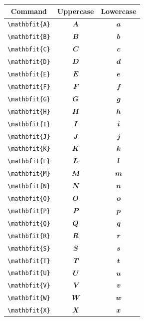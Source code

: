 \documentclass[12pt,a4paper]{article}
\begin{document}
\begin{longtable}{|c|c|c|}
\hline
\textbf{Command} & \textbf{Uppercase} & \textbf{Lowercase} \\
\hline
\verb|\mathbfit{A}| & $\mathbfit{A}$ & $\mathbfit{a}$ \\ %
\verb|\mathbfit{B}| & $\mathbfit{B}$ & $\mathbfit{b}$ \\ %
\verb|\mathbfit{C}| & $\mathbfit{C}$ & $\mathbfit{c}$ \\ %
\verb|\mathbfit{D}| & $\mathbfit{D}$ & $\mathbfit{d}$ \\ %
\verb|\mathbfit{E}| & $\mathbfit{E}$ & $\mathbfit{e}$ \\ %
\verb|\mathbfit{F}| & $\mathbfit{F}$ & $\mathbfit{f}$ \\ %
\verb|\mathbfit{G}| & $\mathbfit{G}$ & $\mathbfit{g}$ \\ %
\verb|\mathbfit{H}| & $\mathbfit{H}$ & $\mathbfit{h}$ \\ %
\verb|\mathbfit{I}| & $\mathbfit{I}$ & $\mathbfit{i}$ \\ %
\verb|\mathbfit{J}| & $\mathbfit{J}$ & $\mathbfit{j}$ \\ %
\verb|\mathbfit{K}| & $\mathbfit{K}$ & $\mathbfit{k}$ \\ %
\verb|\mathbfit{L}| & $\mathbfit{L}$ & $\mathbfit{l}$ \\ %
\verb|\mathbfit{M}| & $\mathbfit{M}$ & $\mathbfit{m}$ \\ %
\verb|\mathbfit{N}| & $\mathbfit{N}$ & $\mathbfit{n}$ \\ %
\verb|\mathbfit{O}| & $\mathbfit{O}$ & $\mathbfit{o}$ \\ %
\verb|\mathbfit{P}| & $\mathbfit{P}$ & $\mathbfit{p}$ \\ %
\verb|\mathbfit{Q}| & $\mathbfit{Q}$ & $\mathbfit{q}$ \\ %
\verb|\mathbfit{R}| & $\mathbfit{R}$ & $\mathbfit{r}$ \\ %
\verb|\mathbfit{S}| & $\mathbfit{S}$ & $\mathbfit{s}$ \\ %
\verb|\mathbfit{T}| & $\mathbfit{T}$ & $\mathbfit{t}$ \\ %
\verb|\mathbfit{U}| & $\mathbfit{U}$ & $\mathbfit{u}$ \\ %
\verb|\mathbfit{V}| & $\mathbfit{V}$ & $\mathbfit{v}$ \\ %
\verb|\mathbfit{W}| & $\mathbfit{W}$ & $\mathbfit{w}$ \\ %
\verb|\mathbfit{X}| & $\mathbfit{X}$ & $\mathbfit{x}$ \\ %

\end{longtable}
\end{document}
